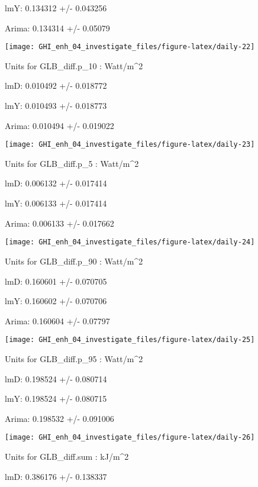 \documentclass[
  10pt,
  a4paper,oneside]{article}
\begin{document}
lmY: 0.134312 +/- 0.043256

Arima: 0.134314 +/- 0.05079

\begin{center}\texttt{[image: GHI\_enh\_04\_investigate\_files/figure-latex/daily-22]} \end{center}

Units for GLB\_diff.p\_10 : Watt/m\^{}2

lmD: 0.010492 +/- 0.018772

lmY: 0.010493 +/- 0.018773

Arima: 0.010494 +/- 0.019022

\begin{center}\texttt{[image: GHI\_enh\_04\_investigate\_files/figure-latex/daily-23]} \end{center}

Units for GLB\_diff.p\_5 : Watt/m\^{}2

lmD: 0.006132 +/- 0.017414

lmY: 0.006133 +/- 0.017414

Arima: 0.006133 +/- 0.017662

\begin{center}\texttt{[image: GHI\_enh\_04\_investigate\_files/figure-latex/daily-24]} \end{center}

Units for GLB\_diff.p\_90 : Watt/m\^{}2

lmD: 0.160601 +/- 0.070705

lmY: 0.160602 +/- 0.070706

Arima: 0.160604 +/- 0.07797

\begin{center}\texttt{[image: GHI\_enh\_04\_investigate\_files/figure-latex/daily-25]} \end{center}

Units for GLB\_diff.p\_95 : Watt/m\^{}2

lmD: 0.198524 +/- 0.080714

lmY: 0.198524 +/- 0.080715

Arima: 0.198532 +/- 0.091006

\begin{center}\texttt{[image: GHI\_enh\_04\_investigate\_files/figure-latex/daily-26]} \end{center}

Units for GLB\_diff.sum : kJ/m\^{}2

lmD: 0.386176 +/- 0.138337
\end{document}
